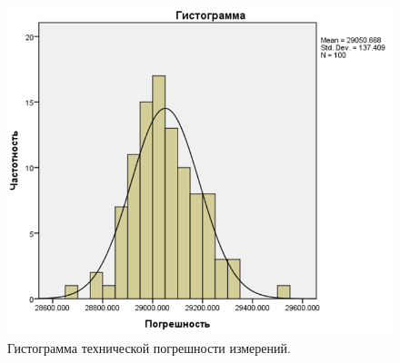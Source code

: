 \begin{figure}[ht!]
\centering
\includegraphics [scale=1] {images/h44.png}
\begin{center}
\caption{Гистограмма технической погрешности измерений.} \label{img44}
\end{center}
\end{figure}



  